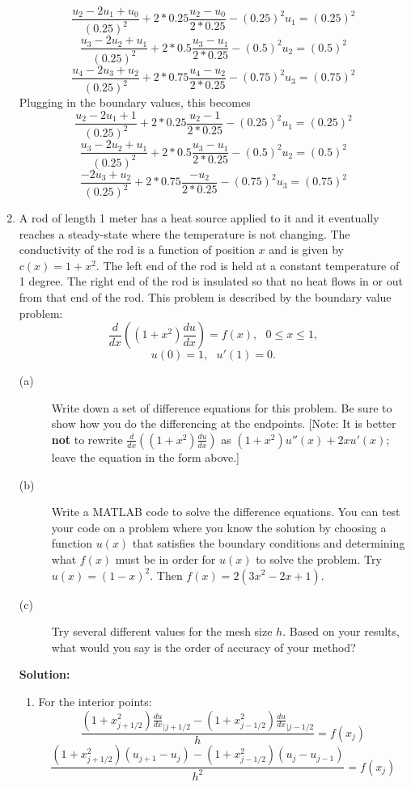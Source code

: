 \documentclass[letterpaper,12pt]{article}
\begin{document}
\begin{enumerate}
\[\frac{u_2-2u_1+u_0}{(0.25)^2} +2*0.25 \frac{u_2-u_0}{2*0.25}-(0.25)^2u_1 = (0.25)^2\]
\[\frac{u_3-2u_2+u_1}{(0.25)^2} +2*0.5 \frac{u_3-u_1}{2*0.25}-(0.5)^2u_2 = (0.5)^2\]
\[\frac{u_4-2u_3+u_2}{(0.25)^2} +2*0.75 \frac{u_4-u_2}{2*0.25}-(0.75)^2u_3 = (0.75)^2\]
Plugging in the boundary values, this becomes
\[\frac{u_2-2u_1+1}{(0.25)^2} +2*0.25 \frac{u_2-1}{2*0.25}-(0.25)^2u_1 = (0.25)^2\]
\[\frac{u_3-2u_2+u_1}{(0.25)^2} +2*0.5 \frac{u_3-u_1}{2*0.25}-(0.5)^2u_2 = (0.5)^2\]
\[\frac{-2u_3+u_2}{(0.25)^2} +2*0.75 \frac{-u_2}{2*0.25}-(0.75)^2u_3 = (0.75)^2\]
\item
A rod of length 1 meter has a heat source applied to it and it eventually
reaches a steady-state where the temperature is not changing.  The
conductivity of the rod is a function of position $x$ and is given by
$c(x) = 1 + x^2$.  The left end of the rod is held at a constant
temperature of 1 degree.  The right end of the rod is insulated so
that no heat flows in or out from that end of the rod.  This problem is
described by the boundary value problem:
\[
\frac{d}{dx} \left( (1 + x^2 ) \frac{du}{dx} \right) = f(x) ,~~~ 
0 \leq x \leq 1 ,
\]
\[
u(0) = 1,~~~u'(1) = 0 .
\]
\begin{description}
\item[(a)] Write down a set of difference equations for this problem.
Be sure to show how you do the differencing at the endpoints.
[Note:  It is better {\bf not} to rewrite 
$\frac{d}{dx} ( ( 1+ x^2 ) \frac{du}{dx} )$ as $(1 + x^2 ) u'' (x) + 2x u'(x)$;
leave the equation in the form above.]
\item[(b)] Write a MATLAB code to solve the difference equations.
You can test your code on a problem where you know the solution
by choosing a function $u(x)$ that satisfies the boundary conditions
and determining what $f(x)$ must be in order for $u(x)$ to solve the
problem.  Try $u(x) = (1-x )^2$.  Then $f(x) = 2( 3 x^2 - 2 x + 1 )$.
\item[(c)] Try several different values for the mesh size $h$.  Based
on your results, what would you say is the order of accuracy of your
method?
\end{description}


{\bf Solution:}
\begin{enumerate}
\item
For the interior points:
\[\frac{(1+x_{j+1/2}^2)\frac{du}{dx}_{|j+1/2} -(1+x_{j-1/2}^2)\frac{du}{dx}_{|j-1/2} }{h}= f(x_{j})\]
\[\frac{(1+x_{j+1/2}^2)(u_{j+1}-u_{j}) -(1+x_{j-1/2}^2)(u_{j}-u_{j-1})  }{h^2}= f(x_{j})\]


\end{enumerate}
\end{enumerate}
\end{document}
